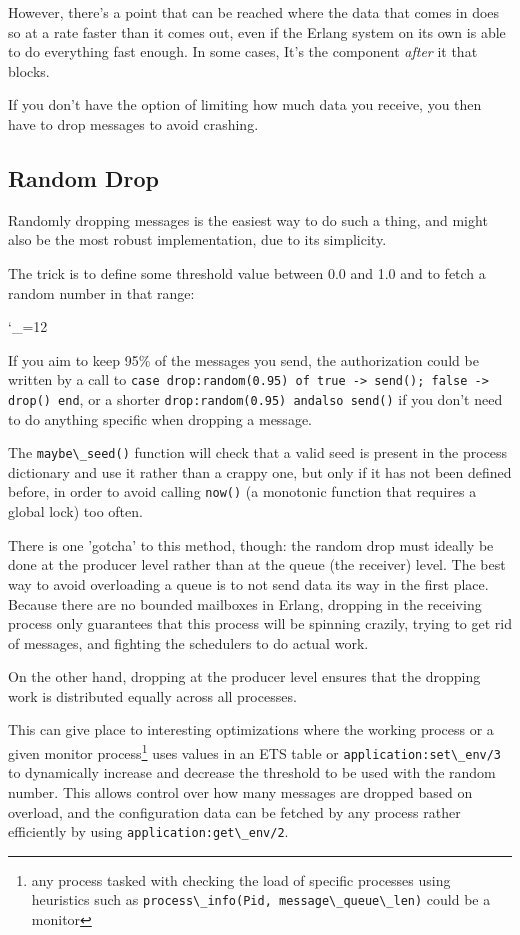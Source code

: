 \documentclass[11pt, oneside]{book}   	%
\newcommand{\function}[1]{\Verb`#1`}
\newcommand{\expression}[1]{\Verb`#1`}
\def\includecode{\begingroup
\catcode`\_=12
\includecodeB}
\newcommand{\includecodeB}[2][erlang]{\VerbatimInput[frame=lines,framesep=2mm,label=#1/#2,fontsize=\small]{#1/#2}\endgroup}
\begin{document}
However, there's a point that can be reached where the data that comes in does so at a rate faster than it comes out, even if the Erlang system on its own is able to do everything fast enough. In some cases, It's the component \emph{after} it that blocks.

If you don't have the option of limiting how much data you receive, you then have to drop messages to avoid crashing.

\subsection{Random Drop}

Randomly dropping messages is the easiest way to do such a thing, and might also be the most robust implementation, due to its simplicity.

The trick is to define some threshold value between 0.0 and 1.0 and to fetch a random number in that range:

\includecode[erlang]{drop.erl}

If you aim to keep 95\% of the messages you send, the authorization could be written by a call to \expression{case drop:random(0.95) of true -> send(); false -> drop() end}, or a shorter \expression{drop:random(0.95) andalso send()} if you don't need to do anything specific when dropping a message. 

The \function{maybe\_seed()} function will check that a valid seed is present in the process dictionary and use it rather than a crappy one, but only if it has not been defined before, in order to avoid calling \function{now()} (a monotonic function that requires a global lock) too often.

There is one 'gotcha' to this method, though: the random drop must ideally be done at the producer level rather than at the queue (the receiver) level. The best way to avoid overloading a queue is to not send data its way in the first place. Because there are no bounded mailboxes in Erlang, dropping in the receiving process only guarantees that this process will be spinning crazily, trying to get rid of messages, and fighting the schedulers to do actual work.

On the other hand, dropping at the producer level ensures that the dropping work is distributed equally across all processes.

This can give place to interesting optimizations where the working process or a given monitor process\footnote{any process tasked with checking the load of specific processes using heuristics such as \expression{process\_info(Pid, message\_queue\_len)} could be a monitor} uses values in an ETS table or \function{application:set\_env/3} to dynamically increase and decrease the threshold to be used with the random number. This allows control over how many messages are dropped based on overload, and the configuration data can be fetched by any process rather efficiently by using \function{application:get\_env/2}.
\end{document}
